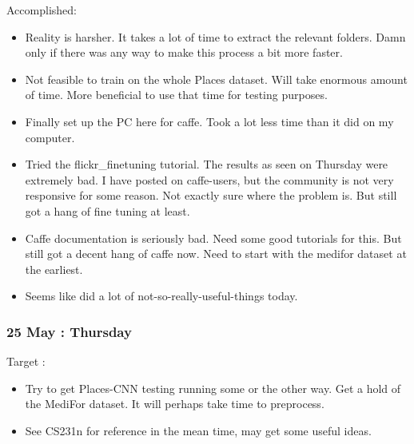 \documentclass{article}
\begin{document}
Accomplished:
\begin{itemize}
\item Reality is harsher. It takes a lot of time to extract the relevant folders. Damn only if there was any way to make this process a bit more faster.
\item Not feasible to train on the whole Places dataset. Will take enormous amount of time. More beneficial to use that time for testing purposes.
\item Finally set up the PC here for caffe. Took a lot less time than it did on my computer.
\item Tried the flickr\_finetuning tutorial. The results as seen on Thursday were extremely bad. I have posted on caffe-users, but the community is not very responsive for some reason. Not exactly sure where the problem is. But still got a hang of fine tuning at least.
\item Caffe documentation is seriously bad. Need some good tutorials for this. But still got a decent hang of caffe now. Need to start with the medifor dataset at the earliest.
\item Seems like did a lot of not-so-really-useful-things today.
\end{itemize}

\subsubsection{25 May : Thursday}
Target :
\begin{itemize}
\item Try to get Places-CNN testing running some or the other way. Get a hold of the MediFor dataset. It will perhaps take time to preprocess.
\item See CS231n for reference in the mean time, may get some useful ideas.
\end{itemize}
\end{document}
